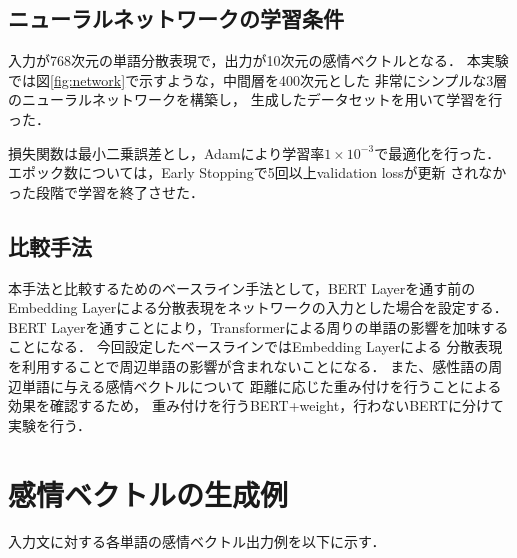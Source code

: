 	\subsection{ニューラルネットワークの学習条件}
		入力が768次元の単語分散表現で，出力が10次元の感情ベクトルとなる．
		本実験では図\ref{fig:network}で示すような，中間層を400次元とした
		非常にシンプルな3層のニューラルネットワークを構築し，
		生成したデータセットを用いて学習を行った．
				
		損失関数は最小二乗誤差とし，Adamにより学習率$1\times10^{-3}$で最適化を行った．
		エポック数については，Early Stoppingで5回以上validation lossが更新
		されなかった段階で学習を終了させた．
		
	\subsection{比較手法}
		本手法と比較するためのベースライン手法として，BERT Layerを通す前の
		Embedding Layerによる分散表現をネットワークの入力とした場合を設定する．
		BERT Layerを通すことにより，Transformerによる周りの単語の影響を加味することになる．
		今回設定したベースラインではEmbedding Layerによる
		分散表現を利用することで周辺単語の影響が含まれないことになる．
		また、感性語の周辺単語に与える感情ベクトルについて
		距離に応じた重み付けを行うことによる効果を確認するため，
		重み付けを行うBERT+weight，行わないBERTに分けて実験を行う．

\section{感情ベクトルの生成例}
	入力文に対する各単語の感情ベクトル出力例を以下に示す．
